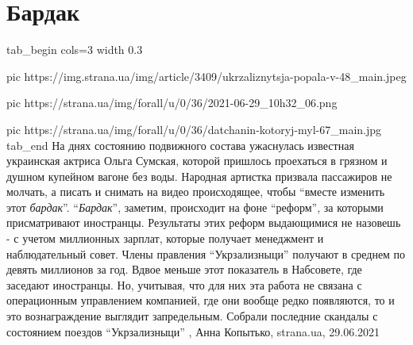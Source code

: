  
 
 
 
 
\chapter{Бардак}

\ifcmt
tab_begin cols=3
	width 0.3

  pic https://img.strana.ua/img/article/3409/ukrzaliznytsja-popala-v-48_main.jpeg

	pic https://strana.ua/img/forall/u/0/36/2021-06-29_10h32_06.png

	pic https://strana.ua/img/forall/u/0/36/datchanin-kotoryj-myl-67_main.jpg
tab_end
\fi
На днях состоянию подвижного состава ужаснулась известная украинская актриса
Ольга Сумская, которой пришлось проехаться в грязном и душном купейном вагоне
без воды. Народная артистка призвала пассажиров не молчать, а писать и снимать
на видео происходящее, чтобы \enquote{вместе изменить этот \emph{бардак}}.
\enquote{\emph{Бардак}}, заметим, происходит на фоне \enquote{реформ}, за которыми
присматривают иностранцы. Результаты этих реформ выдающимися не назовешь - с
учетом миллионных зарплат, которые получает менеджмент и наблюдательный совет.
Члены правления \enquote{Укрзализныци} получают в среднем по девять миллионов
за год.  Вдвое меньше этот показатель в Набсовете, где заседают иностранцы. Но,
учитывая, что для них эта работа не связана с операционным управлением
компанией, где они вообще редко появляются, то и это вознаграждение выглядит
запредельным.  Собрали последние скандалы с состоянием поездов
\enquote{Укрзализныци}
, 
Анна Копытько, strana.ua, 29.06.2021

